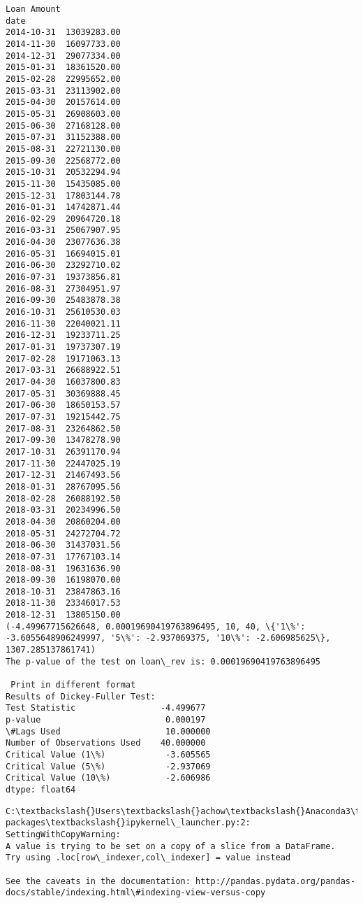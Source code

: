 \documentclass[11pt]{article}
\begin{document}
    \begin{Verbatim}[commandchars=\\\{\}]
            Loan Amount
date                   
2014-10-31  13039283.00
2014-11-30  16097733.00
2014-12-31  29077334.00
2015-01-31  18361520.00
2015-02-28  22995652.00
2015-03-31  23113902.00
2015-04-30  20157614.00
2015-05-31  26908603.00
2015-06-30  27168128.00
2015-07-31  31152388.00
2015-08-31  22721130.00
2015-09-30  22568772.00
2015-10-31  20532294.94
2015-11-30  15435085.00
2015-12-31  17803144.78
2016-01-31  14742871.44
2016-02-29  20964720.18
2016-03-31  25067907.95
2016-04-30  23077636.38
2016-05-31  16694015.01
2016-06-30  23292710.02
2016-07-31  19373856.81
2016-08-31  27304951.97
2016-09-30  25483878.38
2016-10-31  25610530.03
2016-11-30  22040021.11
2016-12-31  19233711.25
2017-01-31  19737307.19
2017-02-28  19171063.13
2017-03-31  26688922.51
2017-04-30  16037800.83
2017-05-31  30369888.45
2017-06-30  18650153.57
2017-07-31  19215442.75
2017-08-31  23264862.50
2017-09-30  13478278.90
2017-10-31  26391170.94
2017-11-30  22447025.19
2017-12-31  21467493.56
2018-01-31  28767095.56
2018-02-28  26088192.50
2018-03-31  20234996.50
2018-04-30  20860204.00
2018-05-31  24272704.72
2018-06-30  31437031.56
2018-07-31  17767103.14
2018-08-31  19631636.90
2018-09-30  16198070.00
2018-10-31  23847863.16
2018-11-30  23346017.53
2018-12-31  13805150.00
(-4.49967715626648, 0.00019690419763896495, 10, 40, \{'1\%': -3.6055648906249997, '5\%': -2.937069375, '10\%': -2.606985625\}, 1307.285137861741)
The p-value of the test on loan\_rev is: 0.00019690419763896495

 Print in different format
Results of Dickey-Fuller Test:
Test Statistic                 -4.499677
p-value                         0.000197
\#Lags Used                     10.000000
Number of Observations Used    40.000000
Critical Value (1\%)            -3.605565
Critical Value (5\%)            -2.937069
Critical Value (10\%)           -2.606986
dtype: float64

    \end{Verbatim}

    \begin{Verbatim}[commandchars=\\\{\}]
C:\textbackslash{}Users\textbackslash{}achow\textbackslash{}Anaconda3\textbackslash{}lib\textbackslash{}site-packages\textbackslash{}ipykernel\_launcher.py:2: SettingWithCopyWarning: 
A value is trying to be set on a copy of a slice from a DataFrame.
Try using .loc[row\_indexer,col\_indexer] = value instead

See the caveats in the documentation: http://pandas.pydata.org/pandas-docs/stable/indexing.html\#indexing-view-versus-copy
  

    \end{Verbatim}
\end{document}
